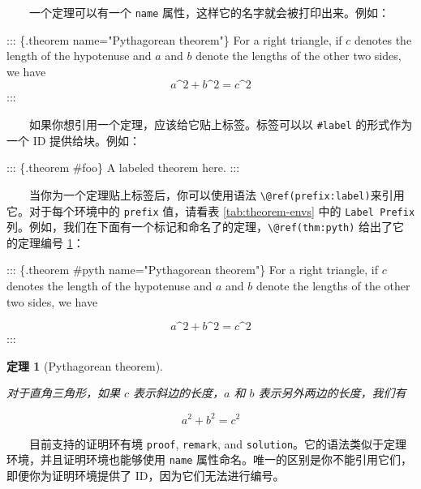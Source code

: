 \documentclass[
  12pt,
]{krantz}
\newenvironment{Shaded}{\begin{snugshade}}{\end{snugshade}}
\newcommand{\NormalTok}[1]{#1}
\newtheorem{theorem}{定理}[chapter]
\theoremstyle{definition}
\theoremstyle{definition}
\theoremstyle{definition}
\theoremstyle{definition}
\theoremstyle{remark}
\begin{document}
  一个定理可以有一个 \texttt{name} 属性，这样它的名字就会被打印出来。例如：

\begin{Shaded}
\begin{Highlighting}[]
\NormalTok{::: \{.theorem name="Pythagorean theorem"\}}
\NormalTok{For a right triangle, if $c$ denotes the length of the hypotenuse}
\NormalTok{and $a$ and $b$ denote the lengths of the other two sides, we have}
\NormalTok{$$a\^{}2 + b\^{}2 = c\^{}2$$}
\NormalTok{:::}
\end{Highlighting}
\end{Shaded}

  如果你想引用一个定理，应该给它贴上标签。标签可以以 \texttt{\#label} 的形式作为一个 ID 提供给块。例如：

\begin{Shaded}
\begin{Highlighting}[]
\NormalTok{::: \{.theorem \#foo\}}
\NormalTok{A labeled theorem here.}
\NormalTok{:::}
\end{Highlighting}
\end{Shaded}

  当你为一个定理贴上标签后，你可以使用语法 \texttt{\textbackslash{}@ref(prefix:label)}来引用它。对于每个环境中的 \texttt{prefix} 值，请看表 \ref{tab:theorem-envs} 中的 \texttt{Label\ Prefix} 列。例如，我们在下面有一个标记和命名了的定理，\texttt{\textbackslash{}@ref(thm:pyth)} 给出了它的定理编号 \ref{thm:pyth}：

\begin{Shaded}
\begin{Highlighting}[]
\NormalTok{::: \{.theorem \#pyth name="Pythagorean theorem"\}}
\NormalTok{For a right triangle, if $c$ denotes the length of the hypotenuse}
\NormalTok{and $a$ and $b$ denote the lengths of the other two sides, we have}

\NormalTok{$$a\^{}2 + b\^{}2 = c\^{}2$$}
\NormalTok{:::}
\end{Highlighting}
\end{Shaded}

\begin{theorem}[Pythagorean theorem]
\protect\hypertarget{thm:pyth}{}\label{thm:pyth}

对于直角三角形，如果 \(c\) 表示斜边的长度，\(a\) 和 \(b\) 表示另外两边的长度，我们有

\[a^2 + b^2 = c^2\]

\end{theorem}

  目前支持的证明环有境 \texttt{proof}, \texttt{remark}, and \texttt{solution}。它的语法类似于定理环境，并且证明环境也能够使用 \texttt{name} 属性命名。唯一的区别是你不能引用它们，即便你为证明环境提供了 ID，因为它们无法进行编号。
\end{document}
